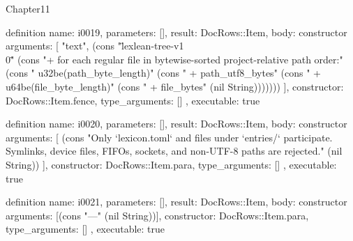 \begin{lexlean}{Chapter11}
\begin{semanticmodule}
definition{
  name: i0019,
  parameters: [],
  result: DocRows::Item,
  body: constructor{
    arguments: [
      "text",
      (cons "\"lexlean-tree-v1\\0\"" (cons "+ for each regular file in bytewise-sorted project-relative path order:" (cons "    u32be(path_byte_length)" (cons "    + path_utf8_bytes" (cons "    + u64be(file_byte_length)" (cons "    + file_bytes" (nil String)))))))
    ],
    constructor: DocRows::Item.fence,
    type_arguments: []
  },
  executable: true
}

definition{
  name: i0020,
  parameters: [],
  result: DocRows::Item,
  body: constructor{
    arguments: [
      (cons "Only `lexicon.toml` and files under `entries/` participate. Symlinks, device files, FIFOs, sockets, and non-UTF-8 paths are rejected." (nil String))
    ],
    constructor: DocRows::Item.para,
    type_arguments: []
  },
  executable: true
}

definition{
  name: i0021,
  parameters: [],
  result: DocRows::Item,
  body: constructor{
    arguments: [(cons "---" (nil String))],
    constructor: DocRows::Item.para,
    type_arguments: []
  },
  executable: true
}
\end{semanticmodule}
\end{lexlean}
